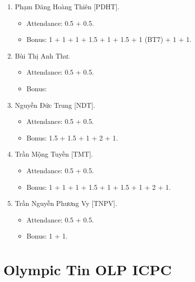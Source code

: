 \documentclass{article}
\begin{document}
\begin{enumerate}
\begin{itemize}
    \end{itemize}
    \item {\sc Phạm Đăng Hoàng Thiên [PDHT].}
    \begin{itemize}
        \item Attendance: 0.5 + 0.5.
        \item Bonus: 1 + 1 + 1 + 1.5 + 1 + 1.5 + 1 (BT7) + 1 + 1.
    \end{itemize}
    \item {\sc Bùi Thị Anh Thư.}
    \begin{itemize}
        \item Attendance: 0.5 + 0.5.
        \item Bonus:
    \end{itemize}
    \item {\sc Nguyễn Đức Trung [NDT].}
    \begin{itemize}
        \item Attendance: 0.5 + 0.5.
        \item Bonus: 1.5 + 1.5 + 1 + 2 + 1.
    \end{itemize}
    \item {\sc Trần Mộng Tuyền [TMT].}
    \begin{itemize}
        \item Attendance: 0.5 + 0.5.
        \item Bonus: 1 + 1 + 1 + 1.5 + 1 + 1.5 + 1 + 2 + 1.
    \end{itemize}
    \item {\sc Trần Nguyễn Phương Vy [TNPV].}
    \begin{itemize}
        \item Attendance: 0.5 + 0.5.
        \item Bonus: 1 + 1.
    \end{itemize}
\end{enumerate}


\section{Olympic Tin OLP ICPC}
\end{document}
